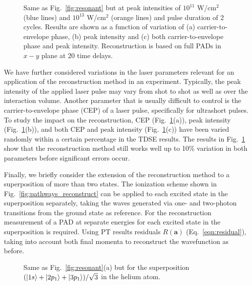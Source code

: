 \begin{figure}[t]
\centering
\caption{
Same as Fig.\ \ref{fig:resonant} but at peak intensities of $10^{11}$ W/cm$^2$ (blue lines) and $10^{13}$ W/cm$^2$ (orange lines) and pulse duration of 2 cycles. Results are shown as a function of variation of (a) carrier-to-envelope phase, (b) peak intensity and (c) both carrier-to-envelope phase and peak intensity. Reconstruction is based on full PADs in $x-y$ plane at 20 time delays.
} 
  \label{fig:noise}
\end{figure}

We have further considered variations in the laser parameters relevant for an application of the reconstruction method in an experiment. Typically, the peak intensity of the applied laser pulse may vary from shot to shot as well as over the interaction volume. Another parameter that is usually difficult to control is the carrier-to-envelope phase (CEP) of a laser pulse, specifically for ultrashort pulses. To study the impact on the reconstruction, CEP (Fig.~\ref{fig:noise}(a)), peak intensity (Fig.~\ref{fig:noise}(b)), and both CEP and peak intensity (Fig.~\ref{fig:noise}(c)) have been varied randomly within a certain percentage in the TDSE results. The results in Fig.~\ref{fig:noise} show that the reconstruction method still works well up to 10\% variation in both parameters before significant errors occur.


Finally, we briefly consider the extension of the reconstruction method to a superposition of more than two states. The ionization scheme shown in Fig.\ \ref{fig:pathways_reconstruct} can be applied to each excited state in the superposition separately, taking the waves generated via one- and two-photon transitions from the ground state as reference. For the reconstruction measurement of a PAD at separate energies for each excited state in the superposition is required. Using PT results residuals $R(\mathbf{a})$ (Eq.\ \ref{eqn:residual}), taking into account both final momenta to reconstruct the wavefunction as before.

\begin{figure}[t]
\centering
\caption{Same as Fig.\ \ref{fig:resonant}(a) but for the superposition $(\ket{1s}+\ket{2p_1}+\ket{3p_1})/\sqrt{3}$ in the helium atom. 
} 
  \label{fig:3-state}
\end{figure}

